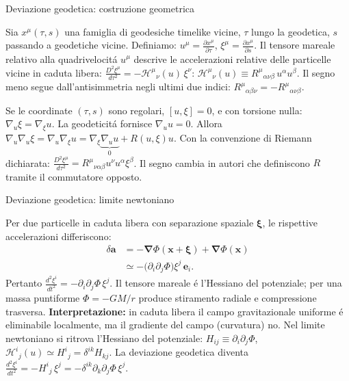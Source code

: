 \begin{frame}[t]{Deviazione geodetica: costruzione geometrica}\small\raggedright
    Sia $x^\mu(\tau,s)$ una famiglia di geodesiche timelike vicine, $\tau$ lungo la geodetica, $s$ passando a geodetiche vicine. Definiamo: $u^\mu=\frac{\partial x^\mu}{\partial\tau}$, $\xi^\mu=\frac{\partial x^\mu}{\partial s}$.
    Il tensore mareale relativo alla quadrivelocit\'a $u^\mu$ descrive le accelerazioni relative delle particelle vicine in caduta libera: $\frac{D^2\xi^\mu}{d\tau^2}=-\mathcal H^\mu{}_{\nu}(u)\,\xi^\nu$: $\mathcal H^\mu{}_{\nu}(u)\equiv R^\mu{}_{\alpha\nu\beta}\,u^\alpha u^\beta$.
Il segno meno segue dall'antisimmetria negli ultimi due indici: $R^\mu{}_{\alpha\beta\nu}=-R^\mu{}_{\alpha\nu\beta}$.

Se le coordinate $(\tau,s)$ sono regolari, $[u,\xi]=0$, e con torsione nulla: $\nabla_u\xi=\nabla_\xi u$. La geodeticit\'a fornisce $\nabla_u u=0$. Allora $\nabla_u\nabla_u\xi=\nabla_u\nabla_\xi u=\nabla_\xi\underbrace{\nabla_u u}_{0}+R(u,\xi)u$. Con la convenzione di Riemann dichiarata: $\frac{D^2\xi^\mu}{d\tau^2}=R^\mu{}_{\nu\alpha\beta}u^\nu u^\alpha\xi^\beta$.
Il segno cambia in autori che definiscono $R$ tramite il commutatore opposto.
\end{frame}

\begin{frame}[t]{Deviazione geodetica: limite newtoniano}\small\raggedright
Per due particelle in caduta libera con separazione spaziale $\boldsymbol\xi$, le rispettive accelerazioni differiscono:
\[
\begin{aligned}
\delta\mathbf a
&=-\boldsymbol\nabla\Phi(\mathbf x+\boldsymbol\xi)
+\boldsymbol\nabla\Phi(\mathbf x)\\
&\simeq-\bigl(\partial_i\partial_j\Phi\bigr)\xi^j\,\mathbf e_i.
\end{aligned}
\]
Pertanto $\frac{d^2\xi^i}{dt^2}=-\partial_i\partial_j\Phi\,\xi^j$.
Il tensore mareale \'e l'Hessiano del potenziale; per una massa puntiforme $\Phi=-GM/r$ produce stiramento radiale e compressione trasversa.
\textbf{Interpretazione:} in caduta libera il campo gravitazionale uniforme \'e eliminabile localmente, ma il gradiente del campo (curvatura) no.
Nel limite newtoniano si ritrova l'Hessiano del potenziale: $H_{ij}\equiv\partial_i\partial_j\Phi$, $\mathcal H^i{}_{j}(u)\simeq H^i{}_{j}=\delta^{ik}H_{kj}$. La deviazione geodetica diventa $\frac{d^2\xi^i}{dt^2}=-H^i{}_{j}\,\xi^j=-\delta^{ik}\partial_k\partial_j\Phi\,\xi^j$.
\end{frame}


